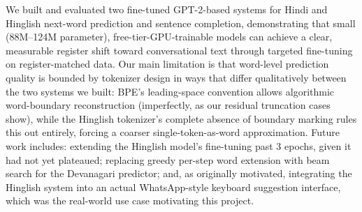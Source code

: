 \documentclass[11pt]{article}
\begin{document}
We built and evaluated two fine-tuned GPT-2-based systems for Hindi and Hinglish next-word prediction and sentence completion, demonstrating that small (88M--124M parameter), free-tier-GPU-trainable models can achieve a clear, measurable register shift toward conversational text through targeted fine-tuning on register-matched data. Our main limitation is that word-level prediction quality is bounded by tokenizer design in ways that differ qualitatively between the two systems we built: BPE's leading-space convention allows algorithmic word-boundary reconstruction (imperfectly, as our residual truncation cases show), while the Hinglish tokenizer's complete absence of boundary marking rules this out entirely, forcing a coarser single-token-as-word approximation. Future work includes: extending the Hinglish model's fine-tuning past 3 epochs, given it had not yet plateaued; replacing greedy per-step word extension with beam search for the Devanagari predictor; and, as originally motivated, integrating the Hinglish system into an actual WhatsApp-style keyboard suggestion interface, which was the real-world use case motivating this project.


\end{document}
